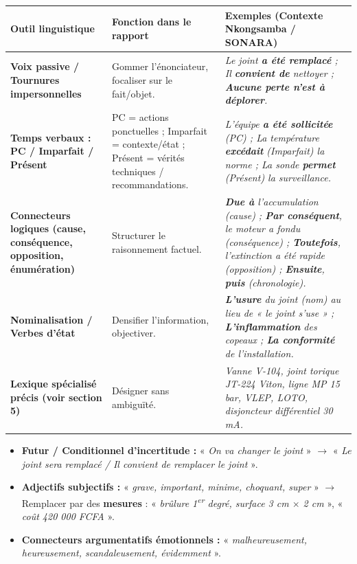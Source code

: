 \documentclass[11pt]{article}
\begin{document}
\begin{center}
\begin{tabularx}{\linewidth}{|l|X|X|}\hline
\rowcolor{popblue}\textbf{Outil linguistique} & \textbf{Fonction dans le rapport} & \textbf{Exemples (Contexte Nkongsamba / SONARA)} \\\hline
\textbf{Voix passive / Tournures impersonnelles} & Gommer l'énonciateur, focaliser sur le fait/objet. & \textit{Le joint \textbf{a été remplacé} ; Il \textbf{convient de} nettoyer ; \textbf{Aucune perte n'est à déplorer}.} \\\hline
\textbf{Temps verbaux : PC / Imparfait / Présent} & PC = actions ponctuelles ; Imparfait = contexte/état ; Présent = vérités techniques / recommandations. & \textit{L'équipe \textbf{a été sollicitée} (PC) ; La température \textbf{excédait} (Imparfait) la norme ; La sonde \textbf{permet} (Présent) la surveillance.} \\\hline
\textbf{Connecteurs logiques (cause, conséquence, opposition, énumération)} & Structurer le raisonnement factuel. & \textit{\textbf{Due à} l'accumulation (cause) ; \textbf{Par conséquent}, le moteur a fondu (conséquence) ; \textbf{Toutefois}, l'extinction a été rapide (opposition) ; \textbf{Ensuite}, \textbf{puis} (chronologie).} \\\hline
\textbf{Nominalisation / Verbes d'état} & Densifier l'information, objectiver. & \textit{\textbf{L'usure} du joint (nom) au lieu de « le joint s'use » ; \textbf{L'inflammation} des copeaux ; \textbf{La conformité} de l'installation.} \\\hline
\textbf{Lexique spécialisé précis (voir section 5)} & Désigner sans ambiguïté. & \textit{Vanne V-104, joint torique JT-224 Viton, ligne MP 15 bar, VLEP, LOTO, disjoncteur différentiel 30 mA.} \\\hline
\end{tabularx}
\end{center}

\begin{attention}
\begin{itemize}
    \item \textbf{Futur / Conditionnel d'incertitude :} « \textit{On va changer le joint} » $\rightarrow$ « \textit{Le joint sera remplacé / Il convient de remplacer le joint} ».
    \item \textbf{Adjectifs subjectifs :} « \textit{grave, important, minime, choquant, super} » $\rightarrow$ Remplacer par des \textbf{mesures} : « \textit{brûlure 1\textsuperscript{er} degré, surface 3 cm $\times$ 2 cm} », « \textit{coût 420 000 FCFA} ».
    \item \textbf{Connecteurs argumentatifs émotionnels :} « \textit{malheureusement, heureusement, scandaleusement, évidemment} ».
\end{itemize}
\end{attention}
\end{document}
